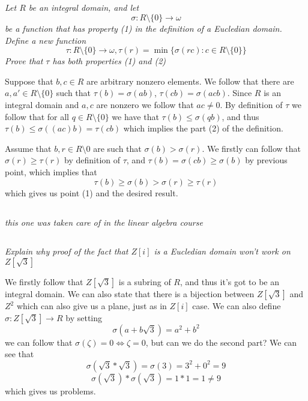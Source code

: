 \documentclass[11pt,oneside,titlepage]{book}
\DeclareMathOperator \lra {\Leftrightarrow}
\newcommand{\set}[1]{\{ #1 \}}
\begin{document}
\subsection{}

\textit{Let $R$ be an integral domain, and let
  $$\sigma: R \setminus \set{0} \to \omega$$
  be a function that has property (1) in the definition of a Eucledian
  domain. Define a new function
  $$\tau: R \setminus \set{0} \to \omega,
  \tau(r) = \min \set{\sigma(rc): c \in R \setminus \set{0}}$$
  Prove that $\tau$ has both properties (1) and (2)
}

Suppose that $b, c \in R$ are arbitrary nonzero elements.  We follow
that there are $a, a' \in R \setminus \set{0}$ such that $\tau(b) =
\sigma(ab)$, $\tau(cb) = \sigma(acb)$. Since $R$ is an integral domain
and $a, c$ are nonzero we follow that $ac \neq 0$. By definition of
$\tau$ we follow that for all $q \in R \setminus \set{0}$ we have that
$\tau(b) \leq \sigma(qb)$, and thus $\tau(b) \leq \sigma((ac)b) =
\tau(cb)$ which implies the part (2) of the definition.


Assume that $b, r \in R \setminus 0$ are such that $\sigma(b) >
\sigma(r)$. We firstly can follow that $\sigma(r) \geq \tau(r)$
by definition of $\tau$, and $\tau(b) = \sigma(cb) \geq \sigma(b)$ by
previous point, which implies that
$$\tau(b) \geq \sigma(b) > \sigma(r) \geq \tau(r)$$
which gives us point (1) and the desired result.

\subsection{}

\textit{this one was taken care of in the linear algebra course}

\subsection{}

\textit{Explain why proof of the fact that $Z[i]$ is a Eucledian domain
  won't work on $Z[\sqrt{3}]$ }

We firstly follow that $Z[\sqrt{3}]$ is a subring of $R$, and thus
it's got to be an integral domain. We can also state that
there is a bijection between $Z[\sqrt{3}]$ and $Z^2$ which
can also give us a plane, just as in $Z[i]$ case. We can also define
$\sigma: Z[\sqrt{3}] \to R$ by setting
$$\sigma(a + b \sqrt{3}) = a^2 + b^2$$
we can follow that $\sigma(\zeta) = 0 \lra \zeta = 0$, but can we do the
second part? We can see that
$$\sigma(\sqrt{3} * \sqrt{3}) = \sigma(3) = 3^2 + 0^2 = 9$$
$$\sigma(\sqrt{3}) * \sigma(\sqrt{3}) = 1 * 1 = 1 \neq 9$$
which gives us problems.
\end{document}
